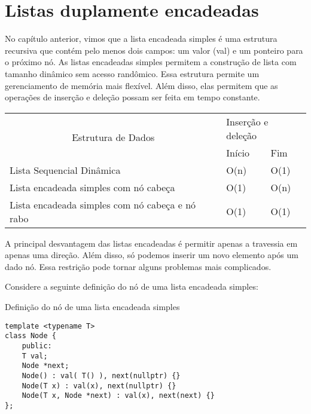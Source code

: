 \chapter{Listas duplamente encadeadas}

No capítulo anterior, vimos que a lista encadeada simples é uma estrutura recursiva que contém pelo menos dois campos: um valor (val) e um ponteiro para o próximo nó. As listas encadeadas simples permitem a construção de lista com tamanho dinâmico sem acesso randômico. Essa estrutura permite um gerenciamento de memória mais flexível. Além disso, elas permitem que as operações de inserção e deleção possam ser feita em tempo constante. 


\begin{center}
\begin{tabular}{|l|ll|}
\hline
\multicolumn{1}{|c|}{\multirow{2}{*}{Estrutura de Dados}} & \multicolumn{2}{l|}{Inserção e deleção} \\ \cline{2-3} 
\multicolumn{1}{|c|}{}                                    & \multicolumn{1}{l|}{Início}    & Fim    \\ \hline
Lista Sequencial Dinâmica                                 & \multicolumn{1}{l|}{O(n)}      & O(1)   \\ \hline
Lista encadeada simples com nó cabeça                     & \multicolumn{1}{l|}{O(1)}      & O(n)   \\ \hline
Lista encadeada simples com nó cabeça e nó rabo           & \multicolumn{1}{l|}{O(1)}      & O(1)   \\ \hline
\end{tabular}
\end{center}

A principal desvantagem das listas encadeadas é permitir apenas a travessia em apenas uma direção. Além disso, só podemos inserir um novo elemento após um dado nó. Essa restrição pode tornar alguns problemas mais complicados.



Considere a seguinte definição do nó de uma lista encadeada simples:
\begin{listing}[!ht]
\caption{Definição do nó de uma lista encadeada simples}

\begin{verbatim}
template <typename T>
class Node {
    public:
    T val;
    Node *next;
    Node() : val( T() ), next(nullptr) {}
    Node(T x) : val(x), next(nullptr) {}
    Node(T x, Node *next) : val(x), next(next) {} 
};

\end{verbatim}
\end{listing}


